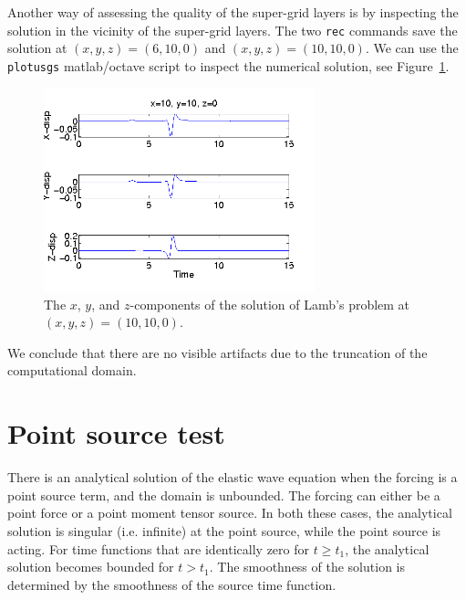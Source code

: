 \documentclass[11pt]{report}
\begin{document}
Another way of assessing the quality of the super-grid layers is by inspecting the solution in the
vicinity of the super-grid layers. The two \verb+rec+ commands save the solution at $(x,y,z)=(6,10,0)$
and $(x,y,z)=(10,10,0)$. We can use the \verb+plotusgs+ matlab/octave script to inspect the
numerical solution, see Figure~\ref{fig:sg2}.
\begin{figure}[ht]
\begin{center}
\includegraphics[width=0.7\textwidth]{sg2.png}
\caption{The $x$, $y$, and $z$-components of the solution of Lamb's problem at $(x,y,z)=(10,10,0)$.}
\label{fig:sg2}
\end{center}
\end{figure}
We conclude that there are no visible artifacts due to the truncation of the computational domain.


\section{Point source test}\label{sec:testpointsource}

There is an analytical solution of the elastic wave equation when the forcing is a point source
term, and the domain is unbounded. The forcing can either be a point force or a point moment tensor
source. In both these cases, the analytical solution is singular (i.e. infinite) at the point source,
while the point source is acting. For time functions that are identically zero for $t\geq t_1$, the
analytical solution becomes bounded for $t>t_1$. The smoothness of the solution is determined by the
smoothness of the source time function.
\end{document}
